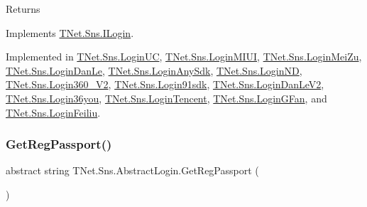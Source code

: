 \begin{DoxyReturn}{Returns}

\end{DoxyReturn}


Implements \mbox{\hyperlink{interface_t_net_1_1_sns_1_1_i_login_a55b0a846946c8ea19a120d8fdb2d7b86}{T\+Net.\+Sns.\+I\+Login}}.



Implemented in \mbox{\hyperlink{class_t_net_1_1_sns_1_1_login_u_c_a1b22d8f5a48d7f62243e6cce124535ea}{T\+Net.\+Sns.\+Login\+UC}}, \mbox{\hyperlink{class_t_net_1_1_sns_1_1_login_m_i_u_i_adcc9f0d697a5d8b1dece2f44028d8301}{T\+Net.\+Sns.\+Login\+M\+I\+UI}}, \mbox{\hyperlink{class_t_net_1_1_sns_1_1_login_mei_zu_a75e7963ccdc475af8d4378efc4becf70}{T\+Net.\+Sns.\+Login\+Mei\+Zu}}, \mbox{\hyperlink{class_t_net_1_1_sns_1_1_login_dan_le_a1b2ba443fc79ee95c2f6db09f9ff5283}{T\+Net.\+Sns.\+Login\+Dan\+Le}}, \mbox{\hyperlink{class_t_net_1_1_sns_1_1_login_any_sdk_a88210952068fcd88986d273ea6b04e86}{T\+Net.\+Sns.\+Login\+Any\+Sdk}}, \mbox{\hyperlink{class_t_net_1_1_sns_1_1_login_n_d_a2a3876bdd12ed6e5cc2bd6a653c2d2d0}{T\+Net.\+Sns.\+Login\+ND}}, \mbox{\hyperlink{class_t_net_1_1_sns_1_1_login360___v2_a2f0d6e19eeca9cf6e86522568767eec1}{T\+Net.\+Sns.\+Login360\+\_\+\+V2}}, \mbox{\hyperlink{class_t_net_1_1_sns_1_1_login91sdk_a7fb59241eea5837cf4dc7c0698502d98}{T\+Net.\+Sns.\+Login91sdk}}, \mbox{\hyperlink{class_t_net_1_1_sns_1_1_login_dan_le_v2_aa75919b2831492c20ce5952e1c506564}{T\+Net.\+Sns.\+Login\+Dan\+Le\+V2}}, \mbox{\hyperlink{class_t_net_1_1_sns_1_1_login36you_a87ec454ab2e41a350763b10827f1b179}{T\+Net.\+Sns.\+Login36you}}, \mbox{\hyperlink{class_t_net_1_1_sns_1_1_login_tencent_a47d0173c57f79fd4c14c5652046b2086}{T\+Net.\+Sns.\+Login\+Tencent}}, \mbox{\hyperlink{class_t_net_1_1_sns_1_1_login_g_fan_abdd4ebf96e43f40d650e107f598109dc}{T\+Net.\+Sns.\+Login\+G\+Fan}}, and \mbox{\hyperlink{class_t_net_1_1_sns_1_1_login_feiliu_a05c5de3660d07218535a0dd4fb77c748}{T\+Net.\+Sns.\+Login\+Feiliu}}.

\mbox{\label{class_t_net_1_1_sns_1_1_abstract_login_a3930eb564bb4804e1b646d749f20907a}} 
\subsubsection{\texorpdfstring{Get\+Reg\+Passport()}{GetRegPassport()}}
{\footnotesize\ttfamily abstract string T\+Net.\+Sns.\+Abstract\+Login.\+Get\+Reg\+Passport (\begin{DoxyParamCaption}{ }\end{DoxyParamCaption})\hspace{0.3cm}{\ttfamily [pure virtual]}}



